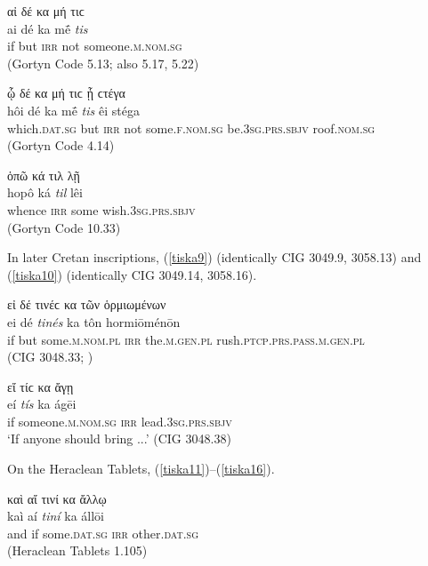 \begin{exe}
\ex αἰ δέ κα μή τιϲ\\
\gll ai dé ka mḗ \emph{tis}\\
if but \textsc{irr} not someone.\textsc{m.nom.sg}\\
\trans (Gortyn Code 5.13; also 5.17, 5.22)
\label{tiska6}
\end{exe}

\begin{exe}
\ex ᾧ δέ κα μή τιϲ ᾖ ϲτέγα\\
\gll hôi dé ka mḗ \emph{tis} êi stéga\\
which.\textsc{dat.sg} but \textsc{irr} not some.\textsc{f.nom.sg} be.\textsc{3sg.prs.sbjv} roof.\textsc{nom.sg}\\
\trans (Gortyn Code 4.14)
\label{tiska7}
\end{exe}

\begin{exe}
\ex ὁπῶ κά τιλ λῇ\\
\gll hopô ká \emph{til} lêi\\
whence \textsc{irr} some wish.\textsc{3sg.prs.sbjv}\\
\trans (Gortyn Code 10.33)
\label{tiska8}
\end{exe}

In later Cretan inscriptions, (\ref{tiska9}) (identically CIG 3049.9, 3058.13) and (\ref{tiska10}) (identically CIG 3049.14, 3058.16).

\begin{exe}
\ex εἰ δέ τινέϲ κα τῶν ὁρμιωμένων\\
\gll ei dé \emph{tinés} ka tôn hormiōménōn\\
if but some.\textsc{m.nom.pl} \textsc{irr} the.\textsc{m.gen.pl} rush.\textsc{ptcp.prs.pass.m.gen.pl}\\
\trans (CIG 3048.33; \citealp[82, no. 123]{Cauer1883})
\label{tiska9}
\end{exe}

\begin{exe}
\ex εἴ τίϲ κα ἄγῃ\\
\gll eí \emph{tís} ka ágēi\\
if someone.\textsc{m.nom.sg} \textsc{irr} lead.\textsc{3sg.prs.sbjv}\\
\trans `If anyone should bring ...' (CIG 3048.38)
\label{tiska10}
\end{exe}

On the Heraclean Tablets, (\ref{tiska11})--(\ref{tiska16}).

\begin{exe}
\ex καὶ αἴ τινί κα ἄλλῳ\\
\gll kaì aí \emph{tiní} ka állōi\\
and if some.\textsc{dat.sg} \textsc{irr} other.\textsc{dat.sg}\\
\trans (Heraclean Tablets 1.105)
\label{tiska11}
\end{exe}

